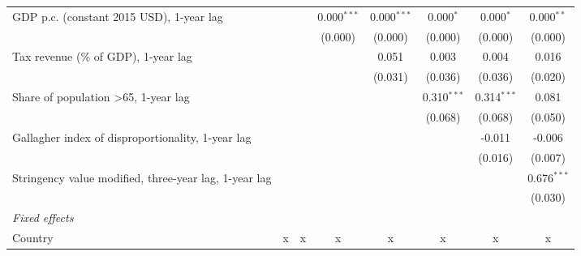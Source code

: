 \begin{table}[htbp]
\begin{tabular}{lccccccc}
      GDP p.c. (constant 2015 USD), 1-year lag                                                  &         &         & 0.000$^{***}$ & 0.000$^{***}$ & 0.000$^{*}$   & 0.000$^{*}$   & 0.000$^{**}$\\   
                                                                                                &         &         & (0.000)       & (0.000)       & (0.000)       & (0.000)       & (0.000)\\   
      Tax revenue (\% of GDP), 1-year lag                                                       &         &         &               & 0.051         & 0.003         & 0.004         & 0.016\\   
                                                                                                &         &         &               & (0.031)       & (0.036)       & (0.036)       & (0.020)\\   
      Share of population >65, 1-year lag                                                       &         &         &               &               & 0.310$^{***}$ & 0.314$^{***}$ & 0.081\\   
                                                                                                &         &         &               &               & (0.068)       & (0.068)       & (0.050)\\   
      Gallagher index of disproportionality, 1-year lag                                         &         &         &               &               &               & -0.011        & -0.006\\   
                                                                                                &         &         &               &               &               & (0.016)       & (0.007)\\   
      Stringency value modified, three-year lag, 1-year lag                                     &         &         &               &               &               &               & 0.676$^{***}$\\   
                                                                                                &         &         &               &               &               &               & (0.030)\\   
      \emph{Fixed effects}\\
      Country                                                                                   & x       & x       & x             & x             & x             & x             & x\\  

\end{tabular}
\end{table}

